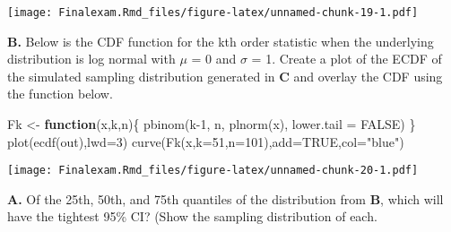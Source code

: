 \documentclass[
]{article}
\newenvironment{Shaded}{\begin{snugshade}}{\end{snugshade}}
\newcommand{\AttributeTok}[1]{\textcolor[rgb]{0.77,0.63,0.00}{#1}}
\newcommand{\ConstantTok}[1]{\textcolor[rgb]{0.00,0.00,0.00}{#1}}
\newcommand{\ControlFlowTok}[1]{\textcolor[rgb]{0.13,0.29,0.53}{\textbf{#1}}}
\newcommand{\DecValTok}[1]{\textcolor[rgb]{0.00,0.00,0.81}{#1}}
\newcommand{\FunctionTok}[1]{\textcolor[rgb]{0.00,0.00,0.00}{#1}}
\newcommand{\NormalTok}[1]{#1}
\newcommand{\OtherTok}[1]{\textcolor[rgb]{0.56,0.35,0.01}{#1}}
\newcommand{\StringTok}[1]{\textcolor[rgb]{0.31,0.60,0.02}{#1}}
\begin{document}
\texttt{[image: Finalexam.Rmd\_files/figure-latex/unnamed-chunk-19-1.pdf]}

\textbf{B.} Below is the CDF function for the kth order statistic when
the underlying distribution is log normal with \(\mu\) = 0 and
\(\sigma\) = 1. Create a plot of the ECDF of the simulated sampling
distribution generated in \textbf{C} and overlay the CDF using the
function below.

\begin{Shaded}
\begin{Highlighting}[]
\NormalTok{Fk }\OtherTok{\textless{}{-}} \ControlFlowTok{function}\NormalTok{(x,k,n)\{}
  \FunctionTok{pbinom}\NormalTok{(k}\DecValTok{{-}1}\NormalTok{, n, }\FunctionTok{plnorm}\NormalTok{(x), }\AttributeTok{lower.tail =} \ConstantTok{FALSE}\NormalTok{)}
\NormalTok{\}}
\FunctionTok{plot}\NormalTok{(}\FunctionTok{ecdf}\NormalTok{(out),}\AttributeTok{lwd=}\DecValTok{3}\NormalTok{)}
\FunctionTok{curve}\NormalTok{(}\FunctionTok{Fk}\NormalTok{(x,}\AttributeTok{k=}\DecValTok{51}\NormalTok{,}\AttributeTok{n=}\DecValTok{101}\NormalTok{),}\AttributeTok{add=}\ConstantTok{TRUE}\NormalTok{,}\AttributeTok{col=}\StringTok{"blue"}\NormalTok{)}
\end{Highlighting}
\end{Shaded}

\texttt{[image: Finalexam.Rmd\_files/figure-latex/unnamed-chunk-20-1.pdf]}

\textbf{A.} Of the 25th, 50th, and 75th quantiles of the distribution
from \textbf{B}, which will have the tightest 95\% CI? (Show the
sampling distribution of each.
\end{document}
